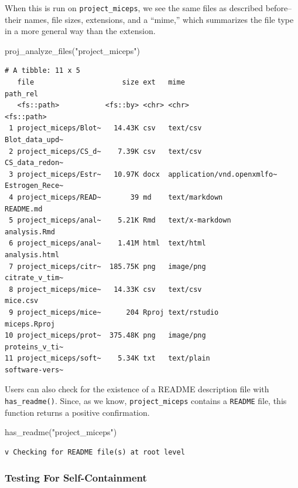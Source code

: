\documentclass[12pt,twoside]{reedthesis}
\newenvironment{Shaded}{\begin{snugshade}}{\end{snugshade}}
\newcommand{\FunctionTok}[1]{\textcolor[rgb]{0.00,0.00,0.00}{#1}}
\newcommand{\NormalTok}[1]{#1}
\newcommand{\StringTok}[1]{\textcolor[rgb]{0.31,0.60,0.02}{#1}}
\begin{document}
When this is run on \texttt{project\_miceps}, we see the same files as described before--their names, file sizes, extensions, and a ``mime,'' which summarizes the file type in a more general way than the extension.
\begin{Shaded}
\begin{Highlighting}[]
\FunctionTok{proj\_analyze\_files}\NormalTok{(}\StringTok{"project\_miceps"}\NormalTok{)}
\end{Highlighting}
\end{Shaded}
\footnotesize
\begin{verbatim}
# A tibble: 11 x 5
   file                     size ext   mime                       path_rel      
   <fs::path>           <fs::by> <chr> <chr>                      <fs::path>    
 1 project_miceps/Blot~   14.43K csv   text/csv                   Blot_data_upd~
 2 project_miceps/CS_d~    7.39K csv   text/csv                   CS_data_redon~
 3 project_miceps/Estr~   10.97K docx  application/vnd.openxmlfo~ Estrogen_Rece~
 4 project_miceps/READ~       39 md    text/markdown              README.md     
 5 project_miceps/anal~    5.21K Rmd   text/x-markdown            analysis.Rmd  
 6 project_miceps/anal~    1.41M html  text/html                  analysis.html 
 7 project_miceps/citr~  185.75K png   image/png                  citrate_v_tim~
 8 project_miceps/mice~   14.33K csv   text/csv                   mice.csv      
 9 project_miceps/mice~      204 Rproj text/rstudio               miceps.Rproj  
10 project_miceps/prot~  375.48K png   image/png                  proteins_v_ti~
11 project_miceps/soft~    5.34K txt   text/plain                 software-vers~
\end{verbatim}
\normalsize

Users can also check for the existence of a README description file with \texttt{has\_readme()}. Since, as we know, \texttt{project\_miceps} contains a \texttt{README} file, this function returns a positive confirmation.
\begin{Shaded}
\begin{Highlighting}[]
\FunctionTok{has\_readme}\NormalTok{(}\StringTok{"project\_miceps"}\NormalTok{)}
\end{Highlighting}
\end{Shaded}
\begin{verbatim}
v Checking for README file(s) at root level
\end{verbatim}
\hypertarget{testing-for-self-containment}{%
\subsubsection{Testing For Self-Containment}\label{testing-for-self-containment}}
\end{document}
